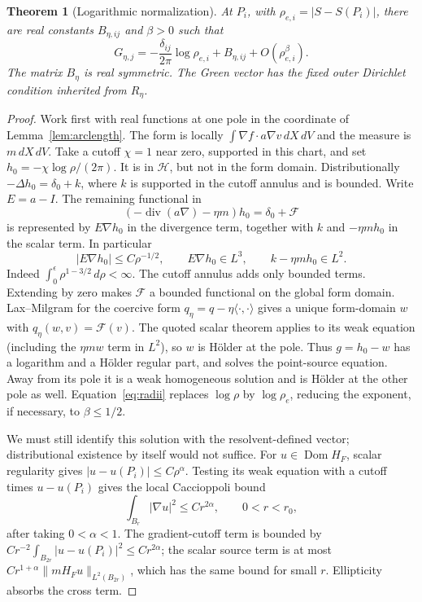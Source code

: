 \documentclass[11pt]{article}
\newtheorem{theorem}{Theorem}[section]
\theoremstyle{remark}\newtheorem{remark}[theorem]{Remark}
\newcommand{\Dom}{\operatorname{Dom}}\newcommand{\dd}{\,d}
\newcommand{\norm}[1]{\lVert#1\rVert}
\begin{document}
\begin{theorem}[Logarithmic normalization]\label{thm:log}
At $P_i$, with $\rho_{e,i}=|S-S(P_i)|$, there are real constants
$B_{\eta,ij}$ and $\beta>0$ such that
\begin{equation}\label{eq:greenexp}
 G_{\eta,j}=-\frac{\delta_{ij}}{2\pi}\log\rho_{e,i}
                  +B_{\eta,ij}+O(\rho_{e,i}^{\beta}).
\end{equation}
The matrix $B_\eta$ is real symmetric. The Green vector has the fixed outer
Dirichlet condition inherited from $R_\eta$.
\end{theorem}
\begin{proof}
Work first with real functions at one pole in the coordinate of
Lemma~\ref{lem:arclength}. The form is locally
$\int \nabla f\cdot a\nabla v\dd X\dd V$ and the measure is
$m\dd X\dd V$. Take a cutoff $\chi=1$ near zero, supported in this chart,
and set $h_0=-\chi\log\rho/(2\pi)$. It is in $\mathcal H$, but not in
the form domain. Distributionally $-\Delta h_0=\delta_0+k$, where $k$
is supported in the cutoff annulus and is bounded. Write $E=a-I$.
The remaining functional in
\[
 (-\operatorname{div}(a\nabla)-\eta m)h_0=\delta_0+\mathcal F
\]
is represented by $E\nabla h_0$ in the divergence term, together with $k$
and $-\eta mh_0$ in the scalar term. In particular
\[
 |E\nabla h_0|\leq C\rho^{-1/2},\qquad
 E\nabla h_0\in L^3,\qquad k-\eta mh_0\in L^2.
\]
Indeed $\int_0^\epsilon \rho^{1-3/2}\dd\rho<\infty$. The cutoff
annulus adds only bounded terms. Extending by zero makes $\mathcal F$ a
bounded functional on the global form domain. Lax--Milgram for the coercive
form $q_\eta=q-\eta\langle\cdot,\cdot\rangle$ gives a unique form-domain
$w$ with $q_\eta(w,v)=\mathcal F(v)$. The quoted scalar theorem applies
to its weak equation (including the $\eta mw$ term in $L^2$), so $w$ is
H\"older at the pole. Thus $g=h_0-w$ has a logarithm and a H\"older
regular part, and solves the point-source equation. Away from its pole it is
a weak homogeneous solution and is H\"older at the other pole as well.
Equation~\eqref{eq:radii} replaces $\log\rho$ by $\log\rho_e$, reducing
the exponent, if necessary, to $\beta\leq1/2$.

We must still identify this solution with the resolvent-defined vector;
distributional existence by itself would not suffice. For
$u\in\Dom H_F$, scalar regularity gives $|u-u(P_i)|\leq C\rho^\alpha$.
Testing its weak equation with a cutoff times $u-u(P_i)$ gives the local
Caccioppoli bound
\[
 \int_{B_r}|\nabla u|^2\leq C r^{2\alpha},\qquad 0<r<r_0,
\]
after taking $0<\alpha<1$. The gradient-cutoff term is bounded by
$Cr^{-2}\int_{B_{2r}}|u-u(P_i)|^2\leq Cr^{2\alpha}$; the scalar source
term is at most $Cr^{1+\alpha}\norm{mH_Fu}_{L^2(B_{2r})}$, which has
the same bound for small $r$. Ellipticity absorbs the cross term.


\end{proof}
\end{document}
